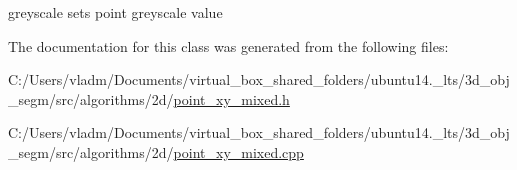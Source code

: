 greyscale sets point greyscale value 



The documentation for this class was generated from the following files\+:\begin{DoxyCompactItemize}
\item 
C\+:/\+Users/vladm/\+Documents/virtual\+\_\+box\+\_\+shared\+\_\+folders/ubuntu14.\+\_\+lts/3d\+\_\+obj\+\_\+segm/src/algorithms/2d/\hyperlink{point__xy__mixed_8h}{point\+\_\+xy\+\_\+mixed.\+h}\item 
C\+:/\+Users/vladm/\+Documents/virtual\+\_\+box\+\_\+shared\+\_\+folders/ubuntu14.\+\_\+lts/3d\+\_\+obj\+\_\+segm/src/algorithms/2d/\hyperlink{point__xy__mixed_8cpp}{point\+\_\+xy\+\_\+mixed.\+cpp}\end{DoxyCompactItemize}
